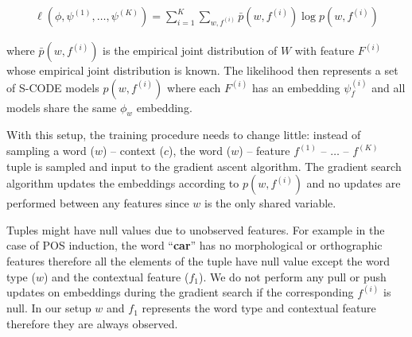 \begin{table}[ht]
  \footnotesize
  \begin{eqnarray}
    \ell(\phi, \psi^{(1)}, \ldots, \psi^{(K)}) =  \label{eq:multicode}
    \sum_{i=1}^K \sum_{w,f^{(i)}} \bar{p}(w,f^{(i)}) \log p(w,f^{(i)})
  \end{eqnarray}
\end{table}
\noindent where $\bar{p}(w, f^{(i)})$ is the empirical joint distribution of
$W$ with feature $F^{(i)}$ whose empirical joint distribution is known.  The
likelihood then represents a set of S-CODE models $p(w,f^{(i)})$ where each
$F^{(i)}$ has an embedding $\psi_f^{(i)}$ and all models share the same
$\phi_w$ embedding.

With this setup, the training procedure needs to change little: instead of
sampling a word ($w$) -- context ($c$), the word ($w$) -- feature $f^{(1)}$ --
$\hdots$ -- $f^{(K)}$ tuple is sampled and input to the gradient ascent
algorithm.  The gradient search algorithm updates the embeddings according to
$p(w,f^{(i)})$ and no updates are performed between any features since $w$ is
the only shared variable.

Tuples might have null values due to unobserved features.  For example in the
case of POS induction, the word ``\textbf{car}'' has no morphological or
orthographic features therefore all the elements of the tuple have null value
except the word type ($w$) and the contextual feature ($f_1$).  We do not
perform any pull or push updates on embeddings during the gradient search if
the corresponding $f^{(i)}$ is null.  In our setup $w$ and $f_1$ represents the
word type and contextual feature therefore they are always observed.


